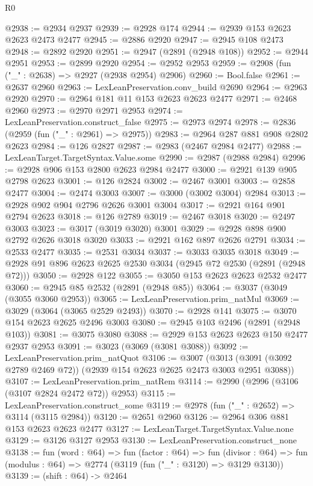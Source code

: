 \begin{lexlean}{R0}
\begin{coremodule}
@2938 := @2934 @2937
@2939 := @2928 @174
@2944 := @2939 @153 @2623 @2623 @2473 @2477
@2945 := @2886 @2920
@2947 := @2945 @108 @2473
@2948 := @2892 @2920
@2951 := @2947 (@2891 (@2948 @108))
@2952 := @2944 @2951
@2953 := @2899 @2920
@2954 := @2952 @2953
@2959 := @2908 (fun ("_" : @2638) => @2927 (@2938 @2954) @2906)
@2960 := Bool.false
@2961 := @2637 @2960
@2963 := LexLeanPreservation.conv_build @2690
@2964 := @2963 @2920
@2970 := @2964 @181 @11 @153 @2623 @2623 @2477
@2971 := @2468 @2960
@2973 := @2970 @2971 @2953
@2974 := LexLeanPreservation.construct_false
@2975 := @2973 @2974
@2978 := @2836 (@2959 (fun ("_" : @2961) => @2975))
@2983 := @2964 @287 @881 @908 @2802 @2623
@2984 := @126 @2827
@2987 := @2983 (@2467 @2984 @2477)
@2988 := LexLeanTarget.TargetSyntax.Value.some
@2990 := @2987 (@2988 @2984)
@2996 := @2928 @906 @153 @2800 @2623 @2984 @2477
@3000 := @2921 @139 @905 @2798 @2623
@3001 := @126 @2824
@3002 := @2467 @3001
@3003 := @2858 @2477
@3004 := @2474 @3003
@3007 := @3000 (@3002 @3004) @2984
@3013 := @2928 @902 @904 @2796 @2626 @3001 @3004
@3017 := @2921 @164 @901 @2794 @2623
@3018 := @126 @2789
@3019 := @2467 @3018
@3020 := @2497 @3003
@3023 := @3017 (@3019 @3020) @3001
@3029 := @2928 @898 @900 @2792 @2626 @3018 @3020
@3033 := @2921 @162 @897 @2626 @2791
@3034 := @2533 @2477
@3035 := @2531 @3034
@3037 := @3033 @3035 @3018
@3049 := @2928 @91 @896 @2623 @2625 @2530 @3034 (@2945 @72 @2530 (@2891 (@2948 @72)))
@3050 := @2928 @122
@3055 := @3050 @153 @2623 @2623 @2532 @2477
@3060 := @2945 @85 @2532 (@2891 (@2948 @85))
@3064 := @3037 (@3049 (@3055 @3060 @2953))
@3065 := LexLeanPreservation.prim_natMul
@3069 := @3029 (@3064 (@3065 @2529 @2493))
@3070 := @2928 @141
@3075 := @3070 @154 @2623 @2625 @2496 @3003
@3080 := @2945 @103 @2496 (@2891 (@2948 @103))
@3081 := @3075 @3080
@3088 := @2929 @153 @2623 @2623 @150 @2477 @2937 @2953
@3091 := @3023 (@3069 (@3081 @3088))
@3092 := LexLeanPreservation.prim_natQuot
@3106 := @3007
    (@3013 (@3091 (@3092 @2789 @2469 @72)) (@2939 @154 @2623 @2625 @2473 @3003 @2951 @3088))
@3107 := LexLeanPreservation.prim_natRem
@3114 := @2990 (@2996 (@3106 (@3107 @2824 @2472 @72)) @2953)
@3115 := LexLeanPreservation.construct_some
@3119 := @2978 (fun ("_" : @2652) => @3114 (@3115 @2984))
@3120 := @2651 @2960
@3126 := @2964 @306 @881 @153 @2623 @2623 @2477
@3127 := LexLeanTarget.TargetSyntax.Value.none
@3129 := @3126 @3127 @2953
@3130 := LexLeanPreservation.construct_none
@3138 := fun (word : @64) =>
  fun (factor : @64) =>
  fun (divisor : @64) => fun (modulus : @64) => @2774 (@3119 (fun ("_" : @3120) => @3129 @3130))
@3139 := (shift : @64) -> @2464

\end{coremodule}
\end{lexlean}
